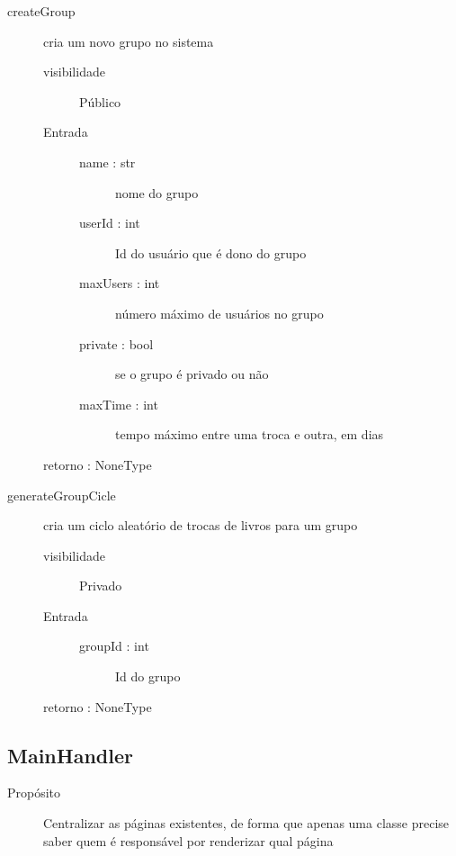\documentclass[a4paper]{article}
\begin{document}
\begin{description}
\begin{description}
			 \end{description} %
			 
			 \item [createGroup] cria um novo grupo no sistema
			\begin{description} %
			 \item [visibilidade] Público
			 \item [Entrada] \mbox{}
				\begin{description} %
				 \item [name : str] nome do grupo
				 \item [userId : int] Id do usuário que é dono do grupo
				 \item [maxUsers : int] número máximo de usuários no grupo
				 \item [private : bool] se o grupo é privado ou não
				 \item [maxTime : int] tempo máximo entre uma troca e outra, em dias
				\end{description} %
				
			 \item [retorno : NoneType ]
				
			\end{description} %
			
			\item [generateGroupCicle] cria um ciclo aleatório de trocas de livros para um grupo
			\begin{description} %
			 \item [visibilidade] Privado
			 \item [Entrada] \mbox{}
				\begin{description} %
				 \item [groupId : int] Id do grupo
				\end{description} %
				
			 \item [retorno : NoneType ]
				
			\end{description} %
			
		\end{description} %
		
	\subsection{MainHandler}
	
	\begin{description}
		\item [Propósito] Centralizar as páginas existentes, de forma que apenas uma classe precise saber quem é responsável por renderizar qual página
	\end{description}
	
\end{document}
